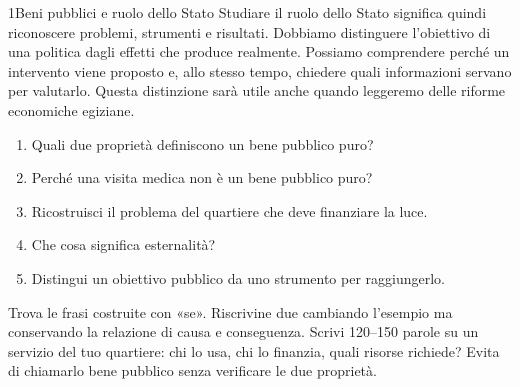 \begin{lettura}{1}{Beni pubblici e ruolo dello Stato}
Studiare il ruolo dello Stato significa quindi riconoscere problemi, strumenti e risultati. Dobbiamo distinguere l'obiettivo di una politica dagli effetti che produce realmente. Possiamo comprendere perché un intervento viene proposto e, allo stesso tempo, chiedere quali informazioni servano per valutarlo. Questa distinzione sarà utile anche quando leggeremo delle riforme economiche egiziane.


\attivita
\begin{enumerate}

\item Quali due proprietà definiscono un bene pubblico puro?

\item Perché una visita medica non è un bene pubblico puro?

\item Ricostruisci il problema del quartiere che deve finanziare la luce.

\item Che cosa significa esternalità?

\item Distingui un obiettivo pubblico da uno strumento per raggiungerlo.

\end{enumerate}
\lessico








\lingua
Trova le frasi costruite con «se». Riscrivine due cambiando l’esempio ma conservando la relazione di causa e conseguenza.
\scrittura
Scrivi 120--150 parole su un servizio del tuo quartiere: chi lo usa, chi lo finanzia, quali risorse richiede? Evita di chiamarlo bene pubblico senza verificare le due proprietà.

\end{lettura}

